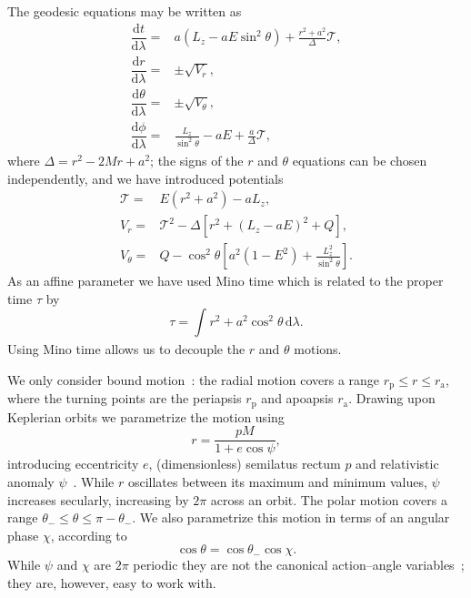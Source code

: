 \documentclass[aps,prd,amsfonts,amssymb,amsmath,nofootinbib,reprint,showpacs]{revtex4}
\newcommand{\sub}[1]{\ensuremath{_\text{#1}}}
\newcommand{\dd}{\ensuremath{\mathrm{d}}}
\newcommand{\diff}[2]{\ensuremath{\dfrac{\dd {#1}}{\dd {#2}}}}
\newcommand{\intd}[4]{\ensuremath{\int_{#1}^{#2}{#3}\,\dd{#4}}}
\begin{document}
The geodesic equations may be written as~\cite{Carter1968, Chandrasekhar1992} %
\begin{subequations}
\begin{align}
\diff{t}{\lambda} = {} & a\left(L_z - aE\sin^2 \theta\right) + \frac{r^2 + a^2}{\Delta}\mathcal{T},\\
\diff{r}{\lambda} = {} & \pm \sqrt{V_r},\\
\diff{\theta}{\lambda} = {} & \pm \sqrt{V_\theta},\\
\diff{\phi}{\lambda} = {} & \frac{L_z}{\sin^2 \theta} - aE + \frac{a}{\Delta}\mathcal{T},
\end{align}
\end{subequations}
where $\Delta = r^2 - 2M r + a^2$; the signs of the $r$ and $\theta$ equations can be chosen independently, and we have introduced potentials
\begin{subequations}
\begin{align}
\mathcal{T} = {} & E\left(r^2 +a^2\right) - aL_z,\\
V_r = {} & \mathcal{T}^2 - \Delta\left[r^2 + \left(L_z -aE\right)^2 + Q\right],\\
V_\theta = {} & Q - \cos^2 \theta\left[a^2\left(1 - E^2\right) + {\displaystyle \frac{L_z^2}{\sin^2\theta}}\right].
\end{align}
\end{subequations}
As an affine parameter we have used Mino time which is related to the proper time $\tau$ by~\cite{Mino2003}
\begin{equation}
\tau = \intd{}{}{r^2 + a^2 \cos^2\theta}{\lambda}.
\end{equation}
Using Mino time allows us to decouple the $r$ and $\theta$ motions.

We only consider bound motion~\cite{Wilkins1972}: the radial motion covers a range $r\sub{p} \leq r \leq r\sub{a}$, where the turning points are the periapsis $r\sub{p}$ and apoapsis $r\sub{a}$. Drawing upon Keplerian orbits we parametrize the motion using
\begin{equation}
r = \frac{p M}{1+e\cos\psi},
\end{equation}
introducing eccentricity $e$, (dimensionless) semilatus rectum $p$ and relativistic anomaly $\psi$~\cite{Darwin1961,Drasco2004}. While $r$ oscillates between its maximum and minimum values, $\psi$ increases secularly, increasing by $2\pi$ across an orbit. The polar motion covers a range $\theta_- \leq \theta \leq \pi - \theta_-$. We also parametrize this motion in terms of an angular phase $\chi$, according to~\cite{Hughes2000}
\begin{equation}
\cos\theta = \cos\theta_-\cos\chi.
\end{equation}
While $\psi$ and $\chi$ are $2\pi$ periodic they are not the canonical action--angle variables~\cite{Schmidt2002}; they are, however, easy to work with.
\end{document}
